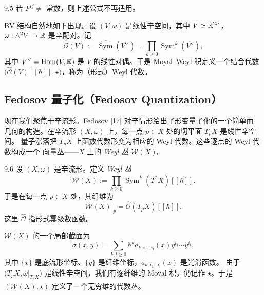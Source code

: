 \begin{wrem}{9.5}
  若 $P^{ij}\neq$ 常数，则上述公式不再适用。
\end{wrem}

BV 结构自然地如下出现。设 $(V,\omega)$ 是线性辛空间，其中 $V\simeq\mathbb{R}^{2n}$，
$\omega:\wedge^{2}V\to\mathbb{R}$ 是辛配对。记
\[
  \widehat{\mathcal{O}}(V):=\widehat{\operatorname{Sym}}(V^{\vee})
  =\prod_{k\ge0}\operatorname{Sym}^{k}(V^{\vee}),
\]
其中 $V^{\vee}=\operatorname{Hom}(V,\mathbb{R})$ 是 $V$ 的线性对偶。于是 Moyal--Weyl 积定义一个结合代数
$\big(\widehat{\mathcal{O}}(V)[[\hbar]],\star\big)$，称为（形式）Weyl 代数。


\subsection{Fedosov 量子化（Fedosov Quantization）}

现在我们聚焦于辛流形。Fedosov \textup{[17]} 对辛情形给出了形变量子化的一个简单而
几何的构造。在辛流形 $(X,\omega)$ 上，每一点 $p\in X$ 处的切平面 $T_pX$ 是线性辛空间。
量子涨落把 $T_pX$ 上函数代数形变为相应的 Weyl 代数。这些逐点的 Weyl 代数构成一个
向量丛——$X$ 上的 \emph{Weyl 丛} $\mathcal{W}(X)$。

\begin{wdefn}{9.6}
  设 $(X,\omega)$ 是辛流形。定义 \emph{Weyl 丛}
  \[
    \mathcal{W}(X):=\prod_{k\ge0}\operatorname{Sym}^{k}(T^{*}X)[[\hbar]].
  \]
  于是在每一点 $p\in X$ 处，其纤维为
  \[
    \mathcal{W}(X)\big|_{p}=\widehat{\mathcal{O}}(T_pX)[[\hbar]].
  \]
  这里 $\widehat{\mathcal{O}}$ 指形式幂级数函数。
\end{wdefn}

$\mathcal{W}(X)$ 的一个局部截面为
\[
  \sigma(x,y)=\sum_{k,l\ge0}\hbar^{k}a_{k,i_1\cdots i_l}(x)
  y^{i_1}\cdots y^{i_l},
\]
其中 $\{x\}$ 是底流形坐标、$\{y\}$ 是纤维坐标，$a_{k,i_1\cdots i_l}(x)$ 是光滑函数。
由于 $\big(T_pX,\omega|_{T_pX}\big)$ 是线性辛空间，我们有逐纤维的 Moyal 积，仍记作
$\star$。于是 $(\mathcal{W}(X),\star)$ 定义了一个无穷维的代数丛。

